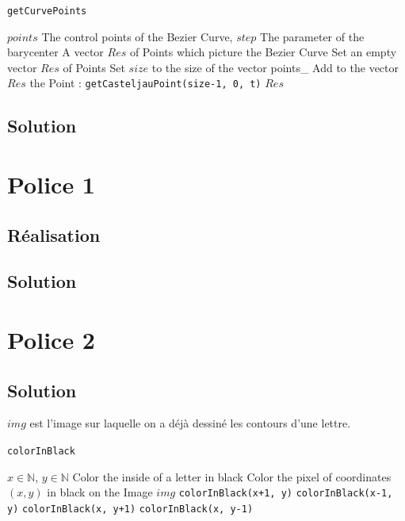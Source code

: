 \documentclass[a4paper, 12pt]{article}
\begin{document}
\begin{itemize}
\begin{algorithm}
	\caption{\texttt{getCurvePoints}}
		\begin{algorithmic}[1]
		\Require $points$ The control points of the Bezier Curve, $step$ The parameter of the barycenter
		\Ensure A vector $Res$ of Points which picture the Bezier Curve
		\State Set an empty vector $Res$ of Points
		\State Set $size$ to the size of the vector points\_
			\State Add to the vector $Res$ the Point : \texttt{getCasteljauPoint(size-1, 0, t)} 
		\EndFor
		\State \Return $Res$
		\EndFunction
		\end{algorithmic}
\end{algorithm}
	
	
\subsection{Solution}

\section{Police 1}	
\subsection{Réalisation}
\subsection{Solution}

\newpage
\section{Police 2}	
\subsection{Solution}

$img$ est l'image sur laquelle on a déjà dessiné les contours d'une lettre.
 
\begin{algorithm}
	\caption{\texttt{colorInBlack}}
		\begin{algorithmic}[1]
		\Require $x \in \mathbb{N}$, $y \in \mathbb{N}$
		\Ensure Color the inside of a letter in black
			\State \Return
		\EndIf
			\State Color the pixel of coordinates $(x, y)$ in black on the Image $img$
			\State \texttt{colorInBlack(x+1, y)} 
			\State \texttt{colorInBlack(x-1, y)} 
			\State \texttt{colorInBlack(x, y+1)} 
			\State \texttt{colorInBlack(x, y-1)} 
		\EndIf	
		\EndFunction
		\end{algorithmic}
\end{algorithm}


\end{itemize}
\end{document}
